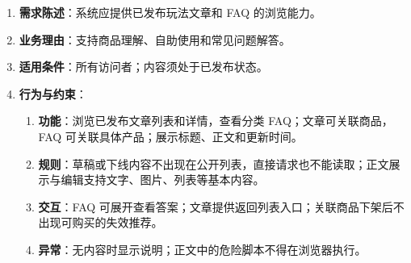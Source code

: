 \begin{enumerate}
\item {\bfseries 需求陈述}：系统应提供已发布玩法文章和 FAQ 的浏览能力。
\item {\bfseries 业务理由}：支持商品理解、自助使用和常见问题解答。
\item {\bfseries 适用条件}：所有访问者；内容须处于已发布状态。
\item {\bfseries 行为与约束}：
\begin{enumerate}
\item {\bfseries 功能}：浏览已发布文章列表和详情，查看分类 FAQ；文章可关联商品，FAQ 可关联具体产品；展示标题、正文和更新时间。
\item {\bfseries 规则}：草稿或下线内容不出现在公开列表，直接请求也不能读取；正文展示与编辑支持文字、图片、列表等基本内容。
\item {\bfseries 交互}：FAQ 可展开查看答案；文章提供返回列表入口；关联商品下架后不出现可购买的失效推荐。
\item {\bfseries 异常}：无内容时显示说明；正文中的危险脚本不得在浏览器执行。
\end{enumerate}

\end{enumerate}


